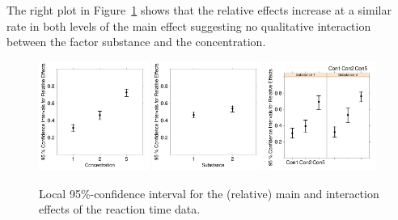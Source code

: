 The right plot in Figure~\ref{fig:nmsCI} shows that the relative effects increase at a similar rate in both levels of the main effect suggesting no qualitative interaction between the factor substance and the concentration. 
\begin{figure}[t!]
\centering
\includegraphics[width=0.32\textwidth]{CI_nms_conc}
\includegraphics[width=0.32\textwidth]{CI_nms_subst}
\includegraphics[width=0.32\textwidth]{CI_nms_substconc}
\caption{\label{fig:nmsCI} Local 95\%-confidence interval for the (relative) main and interaction effects of the reaction time data.}
\end{figure}



